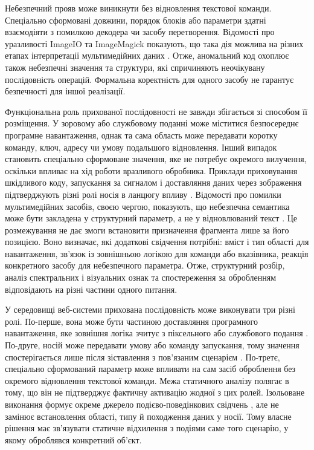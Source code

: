 Небезпечний прояв може виникнути без відновлення текстової команди. Спеціально сформовані довжини, порядок блоків або параметри здатні взаємодіяти з помилкою декодера чи засобу перетворення. Відомості про уразливості ImageIO та ImageMagick показують, що така дія можлива на різних етапах інтерпретації мультимедійних даних \cite{opencve2023cve41064,apple2023cve41064,suse2023cve2157,li2023imagick}. Отже, аномальний код охоплює також небезпечні значення та структури, які спричиняють неочікувану послідовність операцій. Формальна коректність для одного засобу не гарантує безпечності для іншої реалізації.

Функціональна роль прихованої послідовності не завжди збігається зі способом її розміщення. У зоровому або службовому поданні може міститися безпосереднє програмне навантаження, однак та сама область може передавати коротку команду, ключ, адресу чи умову подальшого відновлення. Інший випадок становить спеціально сформоване значення, яке не потребує окремого вилучення, оскільки впливає на хід роботи вразливого обробника. Приклади приховування шкідливого коду, запускання за сигналом і доставляння даних через зображення підтверджують різні ролі носія в ланцюгу впливу \cite{kumagai2022malwareimage,almehmadi2022triggering,iglesias2023driveby}. Відомості про помилки мультимедійних засобів, своєю чергою, показують, що небезпечна семантика може бути закладена у структурний параметр, а не у відновлюваний текст \cite{opencve2023cve41064,suse2023cve2157}. Це розмежування не дає змоги встановити призначення фрагмента лише за його позицією. Воно визначає, які додаткові свідчення потрібні: вміст і тип області для навантаження, зв’язок із зовнішньою логікою для команди або вказівника, реакція конкретного засобу для небезпечного параметра. Отже, структурний розбір, аналіз спектральних і візуальних ознак та спостереження за обробленням відповідають на різні частини одного питання.

У середовищі веб-системи прихована послідовність може виконувати три різні ролі. По-перше, вона може бути частиною доставляння програмного навантаження, яке зовнішня логіка зчитує з піксельного або службового подання \cite{iglesias2023driveby,asharani2024stegosploit,mohan2024stegomalware,badar2025stegomalware,huang2024shellcode,cassavia2022threats}. По-друге, носій може передавати умову або команду запускання, тому значення спостерігається лише після зіставлення з пов’язаним сценарієм \cite{almehmadi2022triggering,checkpoint2024v8,hp2022magniber,khan2023ransomware}. По-третє, спеціально сформований параметр може впливати на сам засіб оброблення без окремого відновлення текстової команди. Межа статичного аналізу полягає в тому, що він не підтверджує фактичну активацію жодної з цих ролей. Ізольоване виконання формує окреме джерело подієво-поведінкових свідчень \cite{abbadini2023sandboxing}, але не замінює встановлення області, типу й походження даних у носії. Тому власне рішення має зв’язувати статичне відхилення з подіями саме того сценарію, у якому оброблявся конкретний об’єкт.

